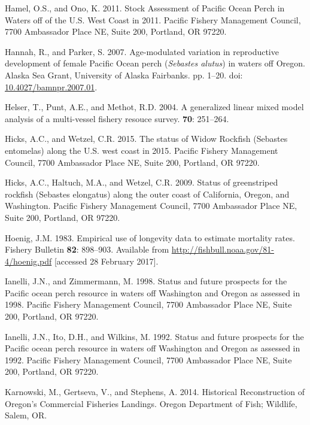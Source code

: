 \documentclass[12pt,]{article}
\begin{document}
\hypertarget{ref-hamel_stock_2011}{}
Hamel, O.S., and Ono, K. 2011. Stock Assessment of Pacific Ocean Perch
in Waters off of the U.S. West Coast in 2011. Pacific Fishery Management
Council, 7700 Ambassador Place NE, Suite 200, Portland, OR 97220.

\hypertarget{ref-hannah_age-modulated_2007}{}
Hannah, R., and Parker, S. 2007. Age-modulated variation in reproductive
development of female Pacific Ocean perch (\emph{Sebastes alutus}) in
waters off Oregon. Alaska Sea Grant, University of Alaska Fairbanks. pp.
1--20. doi:
\href{https://doi.org/10.4027/bamnpr.2007.01}{10.4027/bamnpr.2007.01}.

\hypertarget{ref-helser_generalized_2004}{}
Helser, T., Punt, A.E., and Methot, R.D. 2004. A generalized linear
mixed model analysis of a multi-vessel fishery resouce survey.
\textbf{70}: 251--264.

\hypertarget{ref-hicks_status_2015}{}
Hicks, A.C., and Wetzel, C.R. 2015. The status of Widow Rockfish
(Sebastes entomelas) along the U.S. west coast in 2015. Pacific Fishery
Management Council, 7700 Ambassador Place NE, Suite 200, Portland, OR
97220.

\hypertarget{ref-hicks_status_2009}{}
Hicks, A.C., Haltuch, M.A., and Wetzel, C.R. 2009. Status of
greenstriped rockfish (Sebastes elongatus) along the outer coast of
California, Oregon, and Washington. Pacific Fishery Management Council,
7700 Ambassador Place NE, Suite 200, Portland, OR 97220.

\hypertarget{ref-hoenig_empirical_1983}{}
Hoenig, J.M. 1983. Empirical use of longevity data to estimate mortality
rates. Fishery Bulletin \textbf{82}: 898--903. Available from
\url{http://fishbull.noaa.gov/81-4/hoenig.pdf} {[}accessed 28 February
2017{]}.

\hypertarget{ref-ianelli_status_1998}{}
Ianelli, J.N., and Zimmermann, M. 1998. Status and future prospects for
the Pacific ocean perch resource in waters off Washington and Oregon as
assessed in 1998. Pacific Fishery Management Council, 7700 Ambassador
Place NE, Suite 200, Portland, OR 97220.

\hypertarget{ref-ianelli_status_1992}{}
Ianelli, J.N., Ito, D.H., and Wilkins, M. 1992. Status and future
prospects for the Pacific ocean perch resource in waters off Washington
and Oregon as assessed in 1992. Pacific Fishery Management Council, 7700
Ambassador Place NE, Suite 200, Portland, OR 97220.

\hypertarget{ref-karnowski_historical_2014}{}
Karnowski, M., Gertseva, V., and Stephens, A. 2014. Historical
Reconstruction of Oregon's Commercial Fisheries Landings. Oregon
Department of Fish; Wildlife, Salem, OR.
\end{document}
